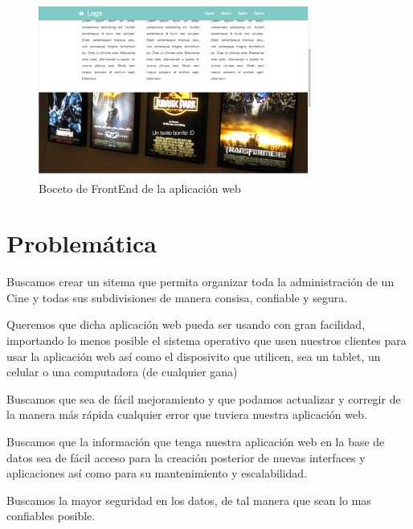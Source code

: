 \documentclass[12pt, fleqn]{report}                             %
\begin{document}
        \begin{figure}[h!]
            \centering
            \includegraphics[width=0.80\textwidth]{Examples1.png}
            \caption{Boceto de FrontEnd de la aplicación web}
        \end{figure}



    \clearpage
    \section{Problemática}
        
        Buscamos crear un sitema que permita organizar toda la administración de un Cine y todas
        sus subdivisiones de manera consisa, confiable y segura.

        Queremos que dicha aplicación web pueda ser usando con gran facilidad, importando lo menos posible
        el sistema operativo que usen nuestros clientes para usar la aplicación web así como el
        disposivito que utilicen, sea un tablet, un celular o una computadora (de cualquier gana)

        Buscamos que sea de fácil mejoramiento y que podamos actualizar y corregir de la manera más rápida
        cualquier error que tuviera nuestra aplicación web.

        Buscamos que la información que tenga nuestra aplicación web en la base de datos sea de fácil acceso
        para la creación posterior de nuevas interfaces y aplicaciones así como para su mantenimiento
        y escalabilidad.

        Buscamos la mayor seguridad en los datos, de tal manera que sean lo mas confiables posible.
\end{document}
